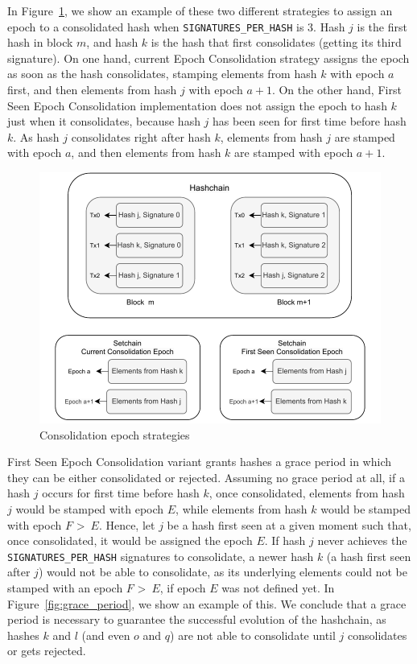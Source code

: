 %

In Figure~\ref{fig:consolidation_epoch}, we show an example of these two different
strategies to assign an epoch to a consolidated hash when
\texttt{SIGNATURES\_PER\_HASH} is 3.
%
Hash $j$ is the first hash in block $m$, and hash $k$ is the hash that first
consolidates (getting its third signature).
%
On one hand, current Epoch Consolidation strategy assigns the epoch as soon as the hash
consolidates, stamping elements from hash $k$ with epoch $a$ first, and then
elements from hash $j$ with epoch $a+1$.
%
On the other hand, First Seen Epoch Consolidation implementation does not assign the
epoch to hash $k$ just when it consolidates, because hash $j$ has been seen for first
time before hash $k$.
%
As hash $j$ consolidates right after hash $k$, elements from hash $j$ are
stamped with epoch $a$, and then elements from hash $k$ are stamped with epoch
$a+1$.

\begin{figure}
  \centering
  \includegraphics[scale=0.5]{figures/consolidation_epoch.pdf}
  \caption{Consolidation epoch strategies}
  \label{fig:consolidation_epoch}
\end{figure}

First Seen Epoch Consolidation variant grants hashes a grace period in which
they can be either consolidated or rejected.
%
Assuming no grace period at all, if a hash $j$ occurs for
first time before hash $k$, once consolidated, elements from hash $j$ would be
stamped with epoch $E$, while elements from hash $k$ would be stamped with epoch
$F$ \textgreater \ $E$.
%
Hence, let $j$ be a hash first seen at a given moment such
that, once consolidated, it would be assigned the epoch $E$.
%
If hash $j$ never achieves the \texttt{SIGNATURES\_PER\_HASH} signatures to
consolidate, a newer hash $k$ (a hash first seen after $j$) would not be able to
consolidate, as its underlying elements could not be stamped with an epoch $F$
\textgreater \ $E$, if epoch $E$ was not defined yet.
%
In Figure~\ref{fig:grace_period}, we show an example of this.
%
We conclude that a grace period is necessary to guarantee the successful evolution of
the hashchain, as hashes $k$ and $l$ (and even $o$ and $q$) are not able to
consolidate until $j$ consolidates or gets rejected.


